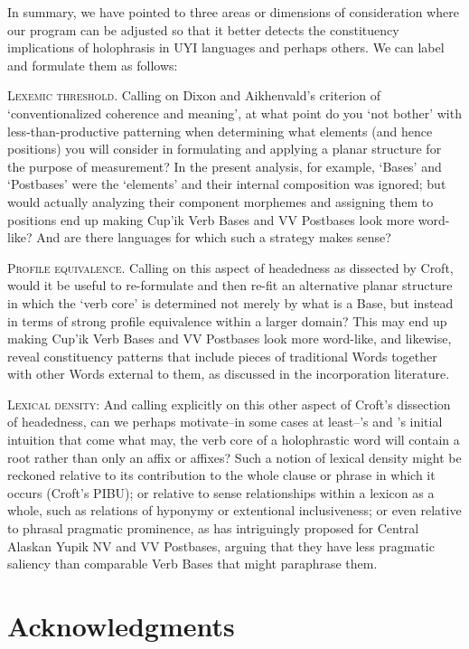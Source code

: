 \documentclass[output=paper]{langscibook}
\begin{document}
In summary, we have pointed to three areas or dimensions of consideration where our program can be adjusted so that it better detects the constituency implications of holophrasis in UYI languages and perhaps others. We can label and formulate them as follows:

\textsc{Lexemic} \textsc{threshold.} Calling on Dixon and Aikhenvald's criterion of `conventionalized coherence and meaning', at what point do you `not bother' with less-than-productive patterning when determining what elements (and hence positions) you will consider in formulating and applying a planar structure for the purpose of measurement? In the present analysis, for example, `Bases' and `Postbases' were the `elements' and their internal composition was ignored; but would actually analyzing their component morphemes and assigning them to positions end up making Cup'ik Verb Bases and VV Postbases look more word-like? And are there languages for which such a strategy makes sense?

\textsc{Profile} \textsc{equivalence.} Calling on this aspect of headedness as dissected by Croft, would it be useful to re-formulate and then re-fit an alternative planar structure in which the `verb core' is determined not merely by what is a Base, but instead in terms of strong profile equivalence within a larger domain? This may end up making Cup'ik Verb Bases and VV Postbases look more word-like, and likewise, reveal constituency patterns that include pieces of traditional Words together with other Words external to them, as discussed in the incorporation literature.

\textsc{Lexical} \textsc{density:} And calling explicitly on this other aspect of Croft's dissection of headedness, can we perhaps motivate--in some cases at least--\citeauthor{Tallman2021}'s and \citeauthor{Croft2001}'s initial intuition that come what may, the verb core of a holophrastic word will contain a root rather than only an affix or affixes? Such a notion of lexical density might be reckoned relative to its contribution to the whole clause or phrase in which it occurs (Croft's PIBU); or relative to sense relationships within a lexicon as a whole, such as relations of hyponymy or extentional inclusiveness; or even relative to phrasal pragmatic prominence, as \citet{Mithun1998} has intriguingly proposed for Central Alaskan Yupik NV and VV Postbases, arguing that they have less pragmatic saliency than comparable Verb Bases that might paraphrase them.


\section*{Acknowledgments}
\end{document}
